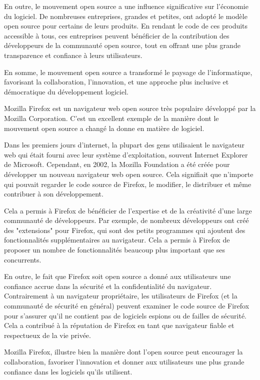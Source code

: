 En outre, le mouvement open source a une influence significative sur l'économie du logiciel. De nombreuses entreprises, grandes et petites, ont adopté le modèle open source pour certains de leurs produits. En rendant le code de ces produits accessible à tous, ces entreprises peuvent bénéficier de la contribution des développeurs de la communauté open source, tout en offrant une plus grande transparence et confiance à leurs utilisateurs.

En somme, le mouvement open source a transformé le paysage de l'informatique, favorisant la collaboration, l'innovation, et une approche plus inclusive et démocratique du développement logiciel.


Mozilla Firefox est un navigateur web open source très populaire développé par la Mozilla Corporation. C'est un excellent exemple de la manière dont le mouvement open source a changé la donne en matière de logiciel.

Dans les premiers jours d'internet, la plupart des gens utilisaient le navigateur web qui était fourni avec leur système d'exploitation, souvent Internet Explorer de Microsoft. Cependant, en 2002, la Mozilla Foundation a été créée pour développer un nouveau navigateur web open source. Cela signifiait que n'importe qui pouvait regarder le code source de Firefox, le modifier, le distribuer et même contribuer à son développement.

Cela a permis à Firefox de bénéficier de l'expertise et de la créativité d'une large communauté de développeurs. Par exemple, de nombreux développeurs ont créé des "extensions" pour Firefox, qui sont des petits programmes qui ajoutent des fonctionnalités supplémentaires au navigateur. Cela a permis à Firefox de proposer un nombre de fonctionnalités beaucoup plus important que ses concurrents.

En outre, le fait que Firefox soit open source a donné aux utilisateurs une confiance accrue dans la sécurité et la confidentialité du navigateur. Contrairement à un navigateur propriétaire, les utilisateurs de Firefox (et la communauté de sécurité en général) peuvent examiner le code source de Firefox pour s'assurer qu'il ne contient pas de logiciels espions ou de failles de sécurité. Cela a contribué à la réputation de Firefox en tant que navigateur fiable et respectueux de la vie privée.

Mozilla Firefox, \cite{mozilla_history} illustre bien la manière dont l'open source peut encourager la collaboration, favoriser l'innovation et donner aux utilisateurs une plus grande confiance dans les logiciels qu'ils utilisent.

